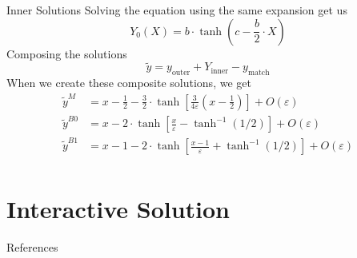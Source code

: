 \begin{frame}{Inner Solutions}
    Solving the equation using the same expansion get us \[
        Y_0(X) = b \cdot \operatorname{tanh}(c - \frac{b}{2}\cdot X)
    \] \pause Composing the solutions \[
        \tilde{y} = y_\text{outer} + Y_\text{inner} - y_\text{match}
    \] \pause
    When we create these composite solutions, we get
        \begin{align*}
            \tilde{y}^{M} &= x - \frac{1}{2} - \frac{3}{2} \cdot \operatorname{tanh}\left[ \frac{3}{4\varepsilon} (x
            - \frac{1}{2}) \right]  + O(\varepsilon)\\
            \tilde{y}^{B0} &= x - 2 \cdot \operatorname{tanh}\left[ \frac{x}{\varepsilon}
            - \operatorname{tanh}^{-1}(1/2) \right] + O(\varepsilon) \\
            \tilde{y}^{B1} &= x - 1 - 2 \cdot \operatorname{tanh}\left[ \frac{x - 1}{\varepsilon}
            + \operatorname{tanh}^{-1}(1/2) \right] + O(\varepsilon) \\
        \end{align*}
\end{frame}


\section{Interactive Solution}%
\label{sec:interactive_solution}

\begin{frame}{References}
    \printbibliography
\end{frame}
